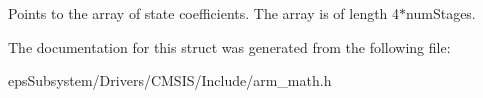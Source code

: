 Points to the array of state coefficients. The array is of length 4$\ast$num\-Stages. 

The documentation for this struct was generated from the following file\-:\begin{DoxyCompactItemize}
\item 
eps\-Subsystem/\-Drivers/\-C\-M\-S\-I\-S/\-Include/arm\-\_\-math.\-h\end{DoxyCompactItemize}
